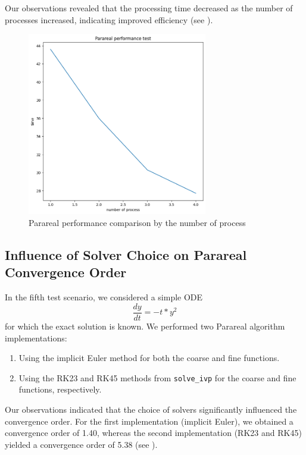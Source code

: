 \documentclass[a4paper,12pt,french]{article}
\begin{document}
Our observations revealed that the processing time decreased as the number of processes increased, indicating improved efficiency (see ).
\begin{figure}[ht!]
    \centering
    \includegraphics[width=0.7\textwidth]{img/par.png}
    \caption{Parareal performance comparison by the number of process}
    \label{fig:6}
\end{figure}

\newpage

\subsection{Influence of Solver Choice on Parareal Convergence Order}
In the fifth test scenario, we considered a simple ODE $$\frac{dy}{dt} = -t * y^2$$
for which the exact solution is known. We performed two Parareal algorithm implementations:

\begin{enumerate}
    \item Using the implicit Euler method for both the coarse and fine functions.
    \item Using the RK23 and RK45 methods from \texttt{solve\_ivp} for the coarse and fine functions, respectively.
\end{enumerate}
Our observations indicated that the choice of solvers significantly influenced the convergence order. For the first implementation (implicit Euler), we obtained a convergence order of 1.40, whereas the second implementation (RK23 and RK45) yielded a convergence order of 5.38 (see ).
\end{document}

